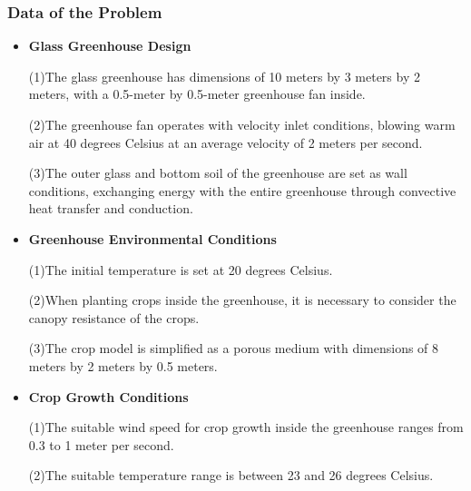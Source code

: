 \documentclass{apmcmthesis}
\begin{document}
\subsubsection{Data of the Problem}
\begin{itemize}
  \item \textbf{Glass Greenhouse Design}
  
  (1)The glass greenhouse has dimensions of 10 meters by 3 meters by 2 meters, with a 0.5-meter by 0.5-meter greenhouse fan inside.
  
  (2)The greenhouse fan operates with velocity inlet conditions, blowing warm air at 40 degrees Celsius at an average velocity of 2 meters per second.
  
  (3)The outer glass and bottom soil of the greenhouse are set as wall conditions, exchanging energy with the entire greenhouse through convective heat transfer and conduction.\cite{3}
  \item \textbf{Greenhouse Environmental Conditions}

  (1)The initial temperature is set at 20 degrees Celsius.
  
  (2)When planting crops inside the greenhouse, it is necessary to consider the canopy resistance of the crops.
  
  (3)The crop model is simplified as a porous medium with dimensions of 8 meters by 2 meters by 0.5 meters.\cite{4}
  \item \textbf{Crop Growth Conditions}

  (1)The suitable wind speed for crop growth inside the greenhouse ranges from 0.3 to 1 meter per second.
  
  (2)The suitable temperature range is between 23 and 26 degrees Celsius.
\end{itemize}
\end{document}
